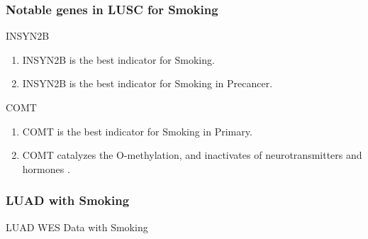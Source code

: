 \documentclass{beamer}
\begin{document}
    \begin{frame}[allowframebreaks]
        \frametitle{Notable genes in LUSC for Smoking}

        \begin{block}{INSYN2B}
            \begin{enumerate}
                \item INSYN2B is the best indicator for Smoking.
                \item INSYN2B is the best indicator for Smoking in Precancer.
            \end{enumerate}
        \end{block}

        \begin{block}{COMT}
            \begin{enumerate}
                \item COMT is the best indicator for Smoking in Primary.
                \item COMT catalyzes the O-methylation, and inactivates of neurotransmitters and hormones \cite{COMT-1, COMT-2}.
            \end{enumerate}
        \end{block}
    \end{frame}

    \begin{frame}
        \frametitle{LUAD with Smoking}

        \begin{table}
            \caption{LUAD WES Data with Smoking}
            \resizebox{!}{0.3 \textheight}
            {}
        \end{table}
    \end{frame}
\end{document}
